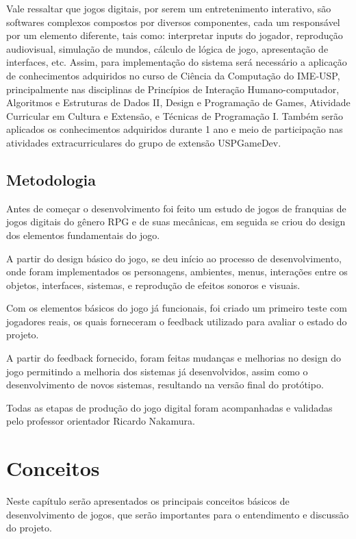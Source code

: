 \documentclass[
	12pt,				%
	openright,			%
	twoside,			%
	a4paper,			%
	english,			%
	french,				%
	spanish,			%
	brazil				%
	]{abntex2}
\begin{document}
	Vale ressaltar que jogos digitais, por serem um entretenimento interativo, são softwares complexos compostos por diversos componentes, cada um responsável por um elemento diferente, tais como: interpretar inputs do jogador, reprodução audiovisual, simulação de mundos, cálculo de lógica de jogo, apresentação de interfaces, etc. Assim, para implementação do sistema será necessário a aplicação de conhecimentos adquiridos no curso de Ciência da Computação do IME-USP, principalmente nas disciplinas de Princípios de Interação Humano-computador, Algoritmos e Estruturas de Dados II, Design e Programação de Games, Atividade Curricular em Cultura e Extensão, e Técnicas de Programação I. Também serão aplicados os conhecimentos adquiridos durante 1 ano e meio de participação nas atividades extracurriculares do grupo de extensão USPGameDev.

\section{Metodologia}

Antes de começar o desenvolvimento foi feito um estudo de jogos de franquias de jogos digitais do gênero RPG e de suas mecânicas, em seguida se criou do design dos elementos fundamentais do jogo.

	A partir do design básico do jogo, se deu início ao processo de desenvolvimento, onde foram implementados os personagens, ambientes, menus, interações entre os objetos, interfaces, sistemas, e reprodução de efeitos sonoros e visuais.

Com os elementos básicos do jogo já funcionais, foi criado um primeiro teste com jogadores reais, os quais forneceram o feedback utilizado para avaliar o estado do projeto.

A partir do feedback fornecido, foram feitas mudanças e melhorias no design do jogo permitindo a melhoria dos sistemas já desenvolvidos, assim como o desenvolvimento de novos sistemas, resultando na versão final do protótipo.

Todas as etapas de produção do jogo digital foram acompanhadas e validadas pelo professor orientador Ricardo Nakamura.

\chapter{Conceitos}

Neste capítulo serão apresentados os principais conceitos básicos de desenvolvimento de jogos, que serão importantes para o entendimento e discussão do projeto.
\end{document}
